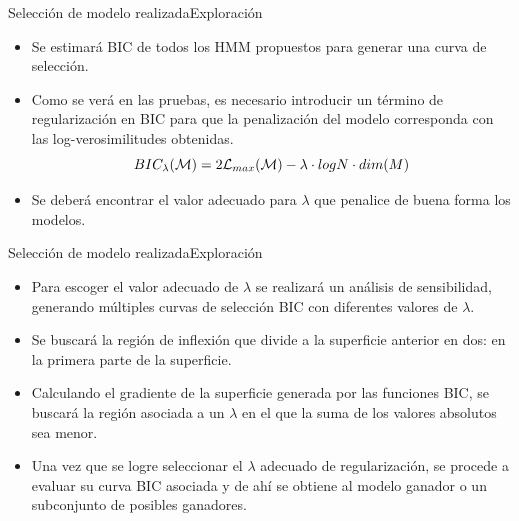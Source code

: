 \begin{frame}{Selección de modelo realizada}{Exploración}
  \begin{itemize} 
    \itemsep1em

    \item
    Se estimará BIC de todos los HMM propuestos para generar una curva de selección. 

    \item Como se verá en las pruebas, es necesario introducir un término de regularización en BIC para que la penalización del modelo corresponda con las log-verosimilitudes obtenidas. 
    \begin{equation}
    BIC_{\lambda}(\mathcal{M}) = 2 \mathcal{L}_{max}(\mathcal{M}) - \lambda \cdot log N \cdot dim(M)
    \end{equation}

    \item Se deberá encontrar el valor adecuado para $\lambda$ que penalice de buena forma los modelos. 
    \end{itemize}   
\end{frame}    

\begin{frame}{Selección de modelo realizada}{Exploración}
  \begin{itemize} 
    \itemsep1em
    \item Para escoger el valor adecuado de $\lambda$ se realizará un análisis de sensibilidad, generando múltiples curvas de selección BIC con diferentes valores de $\lambda$. 

    \item Se buscará la región de inflexión que divide a la superficie anterior en dos: en la primera parte de la superficie. 

    \item Calculando el gradiente de la superficie generada por las funciones BIC, se buscará la región asociada a un $\lambda$ en el que la suma de los valores absolutos sea menor. 

    \item Una vez que se logre seleccionar el $\lambda$ adecuado de regularización, se procede a evaluar su curva BIC asociada y de ahí se obtiene al modelo ganador o un subconjunto de posibles ganadores.
  \end{itemize}   
\end{frame}    

